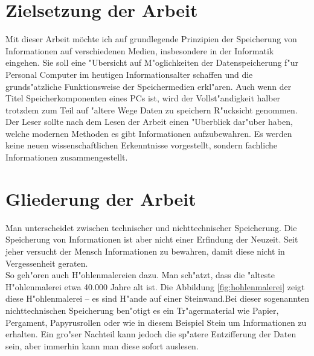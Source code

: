 \section{Zielsetzung der Arbeit}
\label{ch:Einleitung:sec:Zielsetzung}

Mit dieser Arbeit möchte ich auf grundlegende Prinzipien der Speicherung von Informationen auf verschiedenen Medien, insbesondere in der Informatik eingehen. Sie soll eine "Ubersicht auf M"oglichkeiten der Datenspeicherung f"ur Personal Computer im heutigen Informationsalter schaffen und die grunds"atzliche Funktionsweise der Speichermedien erkl"aren. Auch wenn der Titel \glqq Speicherkomponenten eines PCs\grqq{} ist, wird der Vollst"andigkeit halber trotzdem zum Teil auf "altere Wege Daten zu speichern R"ucksicht genommen. Der Leser sollte nach dem Lesen der Arbeit einen "Uberblick dar"uber haben, welche modernen Methoden es gibt Informationen aufzubewahren. Es werden keine neuen wissenschaftlichen Erkenntnisse vorgestellt, sondern fachliche Informationen zusammengestellt.

\section{Gliederung der Arbeit}
\label{ch:Einleitung:sec:Gliederung}

Man unterscheidet zwischen technischer und nichttechnischer Speicherung. Die Speicherung von Informationen ist aber nicht einer Erfindung der Neuzeit. Seit jeher versucht der Mensch Informationen zu bewahren, damit diese nicht in Vergessenheit geraten. 
\\
So geh"oren auch H"ohlenmalereien dazu. Man sch"atzt, dass die "alteste H"ohlenmalerei etwa 40.000 Jahre alt ist. Die Abbildung \ref{fig:hohlenmalerei}  zeigt diese H"ohlenmalerei – es sind H"ande auf einer Steinwand.Bei dieser sogenannten nichttechnischen Speicherung ben"otigt es ein Tr"agermaterial wie Papier, Pergament, Papyrusrollen oder wie in diesem Beispiel Stein um Informationen zu erhalten. Ein gro"ser Nachteil kann jedoch die sp"atere Entzifferung der \glqq Daten\grqq{} sein, aber immerhin kann man diese sofort auslesen.

